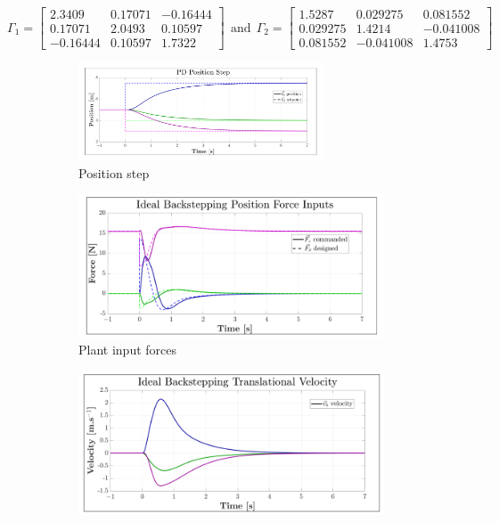 \begin{equation}\label{eq:optimized-Position-IBC}
\Gamma_1 = \begin{bmatrix}
2.3409 & 0.17071 & -0.16444\\
0.17071 & 2.0493 & 0.10597\\
-0.16444 & 0.10597 & 1.7322
\end{bmatrix}
~~\text{and}~~\Gamma_2= \begin{bmatrix}
1.5287 & 0.029275 & 0.081552\\
0.029275 & 1.4214 & -0.041008\\
0.081552 & -0.041008 & 1.4753
\end{bmatrix}
\end{equation}
\par
\begin{figure}[hbtp]
\vspace{-15pt}
\centering
\begin{subfigure}{\textwidth}
\centering
\includegraphics[width=0.8\textwidth]{graphs/IBC_Position_Step}
\caption{Position step}
\label{fig:IBC_Position_Step}
\end{subfigure}
\begin{subfigure}{0.49\textwidth}
\centering
\includegraphics[width=\textwidth]{graphs/IBC_Position_Force}
\caption{Plant input forces}
\label{fig:IBC_Position_Force}
\end{subfigure}
\begin{subfigure}{0.49\textwidth}
\centering
\includegraphics[width=\textwidth]{graphs/IBC_Position_Velocity}

\end{subfigure}
\end{figure}
